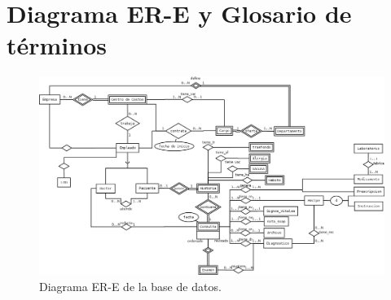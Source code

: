 \appendix

\chapter{Diagrama ER-E y Glosario de términos} \label{ere}

            \begin{figure}
                \begin{center}
                    \includegraphics[scale=.4,angle=90]{figures/DiagramBD}
                \end{center}
                \caption{Diagrama ER-E de la base de datos.}
            \end{figure}

\pagebreak
